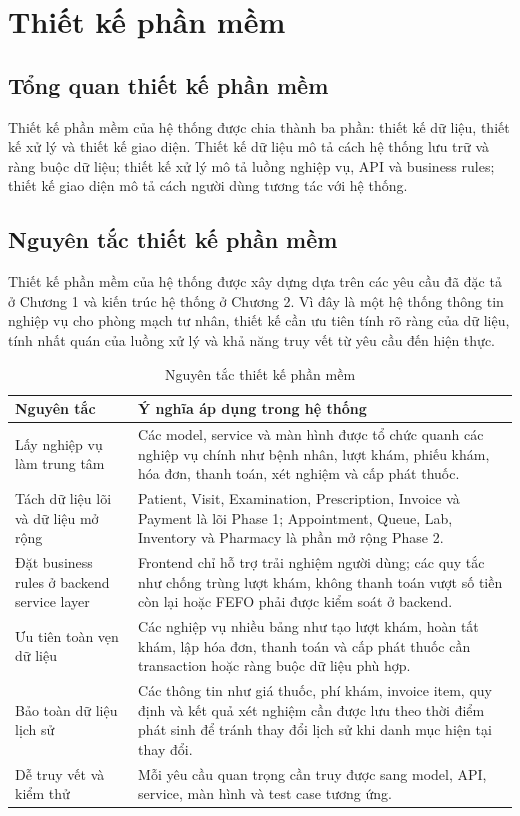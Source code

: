 \chapter{Thiết kế phần mềm}

\section{Tổng quan thiết kế phần mềm}

Thiết kế phần mềm của hệ thống được chia thành ba phần: thiết kế dữ liệu, thiết kế xử lý và thiết kế giao diện. Thiết kế dữ liệu mô tả cách hệ thống lưu trữ và ràng buộc dữ liệu; thiết kế xử lý mô tả luồng nghiệp vụ, API và business rules; thiết kế giao diện mô tả cách người dùng tương tác với hệ thống.

\section{Nguyên tắc thiết kế phần mềm}

Thiết kế phần mềm của hệ thống được xây dựng dựa trên các yêu cầu đã đặc tả ở Chương 1 và kiến trúc hệ thống ở Chương 2. Vì đây là một hệ thống thông tin nghiệp vụ cho phòng mạch tư nhân, thiết kế cần ưu tiên tính rõ ràng của dữ liệu, tính nhất quán của luồng xử lý và khả năng truy vết từ yêu cầu đến hiện thực.

\begin{longtable}{|p{4cm}|p{10.5cm}|}
\caption{Nguyên tắc thiết kế phần mềm}\\
\hline
\textbf{Nguyên tắc} & \textbf{Ý nghĩa áp dụng trong hệ thống} \\
\hline
Lấy nghiệp vụ làm trung tâm & Các model, service và màn hình được tổ chức quanh các nghiệp vụ chính như bệnh nhân, lượt khám, phiếu khám, hóa đơn, thanh toán, xét nghiệm và cấp phát thuốc. \\
\hline
Tách dữ liệu lõi và dữ liệu mở rộng & Patient, Visit, Examination, Prescription, Invoice và Payment là lõi Phase 1; Appointment, Queue, Lab, Inventory và Pharmacy là phần mở rộng Phase 2. \\
\hline
Đặt business rules ở backend service layer & Frontend chỉ hỗ trợ trải nghiệm người dùng; các quy tắc như chống trùng lượt khám, không thanh toán vượt số tiền còn lại hoặc FEFO phải được kiểm soát ở backend. \\
\hline
Ưu tiên toàn vẹn dữ liệu & Các nghiệp vụ nhiều bảng như tạo lượt khám, hoàn tất khám, lập hóa đơn, thanh toán và cấp phát thuốc cần transaction hoặc ràng buộc dữ liệu phù hợp. \\
\hline
Bảo toàn dữ liệu lịch sử & Các thông tin như giá thuốc, phí khám, invoice item, quy định và kết quả xét nghiệm cần được lưu theo thời điểm phát sinh để tránh thay đổi lịch sử khi danh mục hiện tại thay đổi. \\
\hline
Dễ truy vết và kiểm thử & Mỗi yêu cầu quan trọng cần truy được sang model, API, service, màn hình và test case tương ứng. \\
\hline
\end{longtable}

